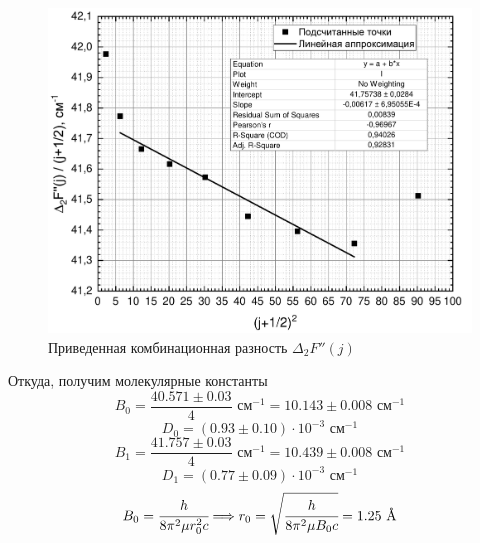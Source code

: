 \begin{figure}[H]
	\vspace{-1cm}
	\centering
	\includegraphics[height=0.49\textheight]{data/delta_F''_j_sq}
	\vspace{-0.2cm}
	\caption{Приведенная комбинационная разность $\Delta_2F''(j)$}
	\label{deltaF''_j}
\end{figure}

\noindent Откуда, получим молекулярные константы
\begin{equation}
B_0 = \dfrac{40.571 \pm 0.03}{4} \text{ см}^{-1}
= 10.143 \pm 0.008 \text{ см$^{-1}$}
\end{equation}
\begin{equation}
D_0 = (0.93 \pm 0.10) \cdot 10^{-3} \text{ см$^{-1}$}
\end{equation}
\begin{equation}
B_1 = \dfrac{41.757 \pm 0.03}{4} \text{ см}^{-1}
= 10.439 \pm 0.008 \text{ см$^{-1}$}
\end{equation}
\begin{equation}
D_1 = (0.77 \pm 0.09) \cdot 10^{-3} \text{ см$^{-1}$}
\end{equation}
\begin{equation}
B_0 = \cfrac{h}{8\pi^2\mu r_0^2c} \Longrightarrow
r_0 = \sqrt{\cfrac{h}{8\pi^2\mu B_0 c}} = 1.25 \text{ \AA}
\end{equation}

